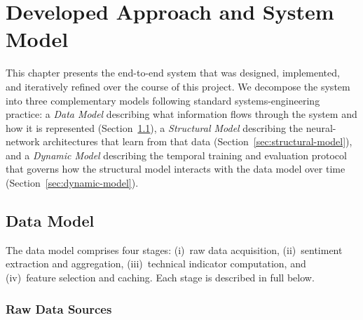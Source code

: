 

\chapter{Developed Approach and System Model}
\label{ch:approach}

This chapter presents the end-to-end system that was designed, implemented, and
iteratively refined over the course of this project.  We decompose the system
into three complementary models following standard systems-engineering practice:
a \emph{Data Model} describing what information flows through the system and how
it is represented (Section~\ref{sec:data-model}), a \emph{Structural Model}
describing the neural-network architectures that learn from that data
(Section~\ref{sec:structural-model}), and a \emph{Dynamic Model} describing the
temporal training and evaluation protocol that governs how the structural model
interacts with the data model over time (Section~\ref{sec:dynamic-model}).

\section{Data Model}
\label{sec:data-model}

The data model comprises four stages: (i)~raw data acquisition,
(ii)~sentiment extraction and aggregation, (iii)~technical indicator
computation, and (iv)~feature selection and caching.  Each stage is described
in full below.

\subsection{Raw Data Sources}
\label{sec:raw-data}

